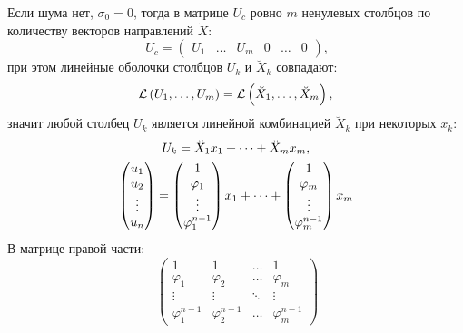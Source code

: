 Если шума нет, $\sigma_0 = 0$, тогда в матрице $U_c$ ровно $m$ ненулевых столбцов по количеству векторов направлений $\breve{X}$:
\begin{equation}~\label{direction:U_columns}
    U_c
    = \begin{pmatrix}
        U_1 & \dots & U_m & 0 & \dots & 0
    \end{pmatrix} ,
\end{equation}
при этом линейные оболочки столбцов $U_k$ и $\breve{X}_k$ совпадают:
\[
    \mathcal{L} \left ( U_1, \dots, U_m \right ) = \mathcal{L} \left ( \breve{X}_1, \dots, \breve{X}_m \right ) ,
\]
значит любой столбец $U_k$ является линейной комбинацией $\breve{X}_k$ при некоторых $x_k$:
\begin{gather}
    U_k = \breve{X}_1 x_1 + \dots + \breve{X}_m x_m , \notag \\
    \begin{pmatrix}
        u_1    \\
        u_2    \\
        \vdots \\
        u_n
    \end{pmatrix}
    = \begin{pmatrix}
        1         \\
        \varphi_1 \\
        \vdots    \\
        \varphi_1^{n-1}
    \end{pmatrix}
    x_1
    + \dots
    + \begin{pmatrix}
        1         \\
        \varphi_m \\
        \vdots    \\
        \varphi_m^{n-1}
    \end{pmatrix}
    x_m
    \label{direction:u_system}
\end{gather}
В матрице правой части:
\begin{equation}~\label{direction:shifts_powers}
    \begin{pmatrix}
        1               & 1               & \dots  & 1               \\
        \varphi_1       & \varphi_2       & \dots  & \varphi_m       \\
        \vdots          & \vdots          & \ddots & \vdots          \\
        \varphi_1^{n-1} & \varphi_2^{n-1} & \dots  & \varphi_m^{n-1}
    \end{pmatrix}
\end{equation}
